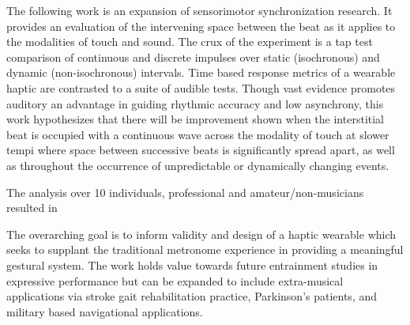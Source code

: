 
\setlength{\parskip}{1em}
\setlength{\parindent}{0em}

\noindent

The following work is an expansion of sensorimotor synchronization research. It provides an evaluation of the intervening space between the beat as it applies to the modalities of touch and sound. The crux of the experiment is a tap test comparison of continuous and discrete impulses over static (isochronous) and dynamic (non-isochronous) intervals. Time based response metrics of a wearable haptic are contrasted to a suite of audible tests. Though vast evidence promotes auditory an advantage in guiding rhythmic accuracy and low asynchrony, this work hypothesizes that there will be improvement shown when the interstitial beat is occupied with a continuous wave across the modality of touch at slower tempi where space between successive beats is significantly spread apart, as well as throughout the occurrence of unpredictable or dynamically changing events. 

The analysis over 10 individuals, professional and amateur/non-musicians resulted in 


The overarching goal is to inform validity and design of a haptic wearable which seeks to supplant the traditional metronome experience in providing a meaningful gestural system. The work holds value towards future entrainment studies in expressive performance but can be expanded to include extra-musical applications via stroke gait rehabilitation practice, Parkinson's patients, and military based navigational applications.